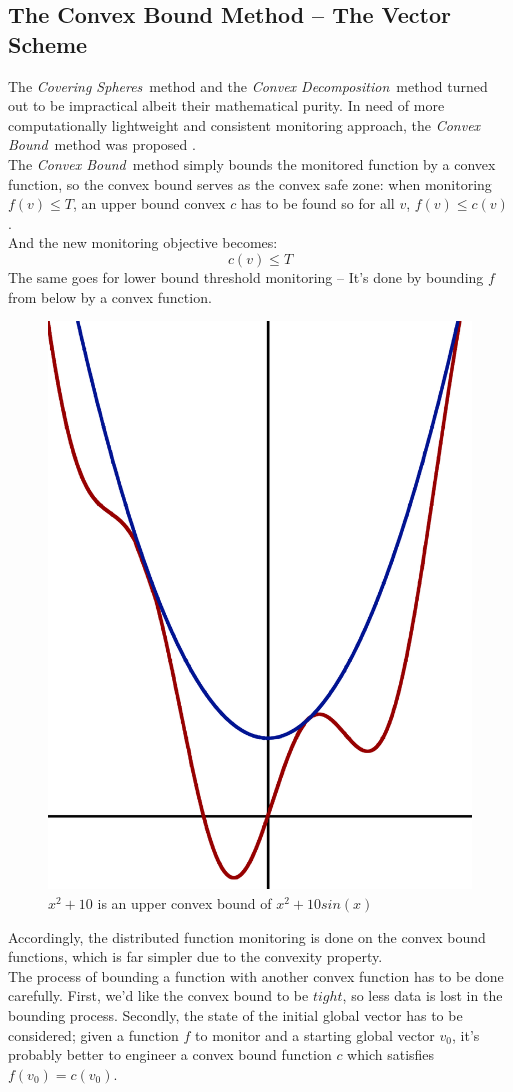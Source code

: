 \documentclass[10pt, conference]{IEEEtran}
\newcommand{\coveringSpheres}{\textit{Covering Spheres}}
\newcommand{\convexDecomposition}{\textit{Convex Decomposition}}
\newcommand{\convexBound}{\textit{Convex Bound}}
\begin{document}
\subsection{The Convex Bound Method -- The Vector Scheme}
The \coveringSpheres \ method and the \convexDecomposition \ method turned out to be impractical albeit their mathematical purity. In need of more computationally lightweight and consistent monitoring approach, the \convexBound \ method was proposed \cite{lazerson2018lightweight}. \\
The \convexBound \ method simply bounds the monitored function by a convex function, so the convex bound serves as the convex safe zone: when monitoring $f(v) \leq T$, an upper bound convex $c$ has to be found so for all $v$, $f(v) \leq  c(v)$. \\
And the new monitoring objective becomes:
\begin{equation}
\label{monitoringConstraint}
c(v) \leq T
\end{equation}
The same goes for lower bound threshold monitoring -- It's done by bounding $f$ from below by a convex function.
\begin{figure}[t]
\begin{center}
\includegraphics[width=0.3\linewidth]{Pics/PNGs/ConvexBound.png}
\end{center}
\caption{$x^2+10$ is an upper convex bound of $x^2+10sin(x)$}
\end{figure}
Accordingly, the distributed function monitoring is done on the convex bound functions, which is far simpler due to the convexity property. \\
The process of bounding a function with another convex function has to be done carefully. First, we'd like the convex bound to be $tight$, so less data is lost in the bounding process. Secondly, the state of the initial global vector has to be considered;
given a function $f$ to monitor and a starting global vector $v_0$, it's probably better to engineer a convex bound function $c$ which satisfies ${f(v_0)=c(v_0)}$. \\
\end{document}

